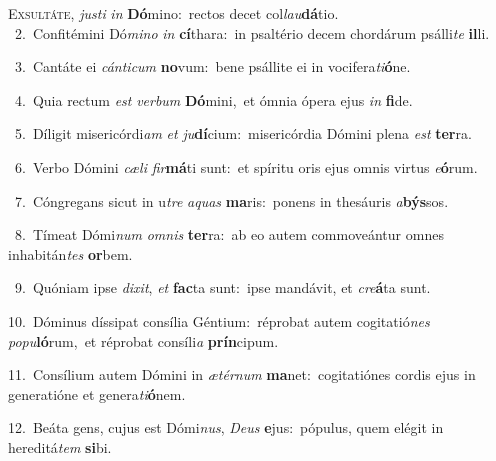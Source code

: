 \lettrine{\initial\textcolor{\initialcolor}{E}}{xsultáte,} \textit{jus}\-\textit{ti} \textit{in} \textbf{Dó}\-mino:~\star rectos decet col\-\textit{lau}\-\textbf{dá}tio.\\
{\numbfont\textcolor{\numbcolor}{~2.}}~Confitémini Dó\-\textit{mi}\-\textit{no} \textit{in} \textbf{cí}\-thara:~\star in psaltério decem chordárum psálli\textit{te} \textbf{il}\-li.\par
{\numbfont\textcolor{\numbcolor}{~3.}}~Cantáte ei \textit{cán}\-\textit{ti}\textit{cum} \textbf{no}\-vum:~\star bene psállite ei in vocifera\-\textit{ti}\-\textbf{ó}ne.\par
{\numbfont\textcolor{\numbcolor}{~4.}}~Quia rectum \textit{est} \textit{ver}\-\textit{bum} \textbf{Dó}\-mini,~\star et ómnia ópera ejus \textit{in} \textbf{fi}\-de.\par
{\numbfont\textcolor{\numbcolor}{~5.}}~Díligit misericórdi\textit{am} \textit{et} \textit{ju}\-\textbf{dí}cium:~\star misericórdia Dómini plena \textit{est} \textbf{ter}\-ra.\par
{\numbfont\textcolor{\numbcolor}{~6.}}~Verbo Dómini \textit{cæ}\-\textit{li} \textit{fir}\-\textbf{má}ti sunt:~\star et spíritu oris ejus omnis virtus \textit{e}\-\textbf{ó}rum.\par
{\numbfont\textcolor{\numbcolor}{~7.}}~Cóngregans sicut in u\textit{tre} \textit{a}\-\textit{quas} \textbf{ma}\-ris:~\star ponens in thesáuris \textit{a}\-\textbf{býs}sos.\par
{\numbfont\textcolor{\numbcolor}{~8.}}~Tímeat Dómi\textit{num} \textit{om}\-\textit{nis} \textbf{ter}\-ra:~\star ab eo autem commoveántur omnes inhabitán\textit{tes} \textbf{or}\-bem.\par
{\numbfont\textcolor{\numbcolor}{~9.}}~Quóniam ipse \textit{di}\-\textit{xit}, \textit{et} \textbf{fac}\-ta sunt:~\star ipse mandávit, et \textit{cre}\-\textbf{á}ta sunt.\par
{\numbfont\textcolor{\numbcolor}{10.}}~Dóminus díssipat consília Géntium:~\dagger réprobat autem cogitatió\textit{nes} \textit{po}\-\textit{pu}\textbf{ló}rum,~\star et réprobat consíli\textit{a} \textbf{prín}\-cipum.\par
{\numbfont\textcolor{\numbcolor}{11.}}~Consílium autem Dómini in \textit{æ}\-\textit{tér}\textit{num} \textbf{ma}\-net:~\star cogitatiónes cordis ejus in generatióne et genera\-\textit{ti}\-\textbf{ó}nem.\par
{\numbfont\textcolor{\numbcolor}{12.}}~Beáta gens, cujus est Dómi\-\textit{nus}\-, \textit{De}\-\textit{us} \textbf{e}\-jus:~\star pópulus, quem elégit in hereditá\textit{tem} \textbf{si}\-bi.\par
